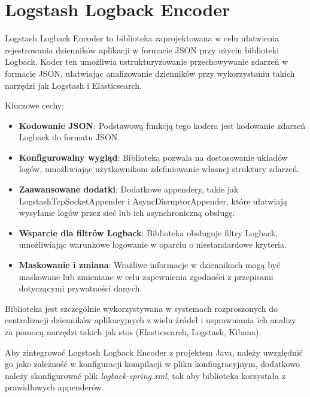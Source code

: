 \section{Logstash Logback Encoder}

Logstash Logback Encoder to biblioteka zaprojektowana w celu ułatwienia rejestrowania dzienników aplikacji w formacie JSON przy użyciu biblioteki Logback. Koder ten umożliwia ustrukturyzowanie przechowywanie zdarzeń w formacie JSON, ułatwiając analizowanie dzienników przy wykorzystaniu takich narzędzi jak Logstash i Elasticsearch\cite{logstashLogbackEncoderOverview}. 

Kluczowe cechy:

\begin{itemize}
    \item \textbf{Kodowanie JSON}: Podstawową funkcją tego kodera jest kodowanie zdarzeń Logback do formatu JSON\cite{logstashLogbackEncoderOverview}.
    \item \textbf{Konfigurowalny wygląd}: Biblioteka pozwala na dostosowanie układów logów, umożliwiając użytkownikom zdefiniowanie własnej struktury zdarzeń\cite{logstashLogbackEncoderOverview}.
    \item \textbf{Zaawansowane dodatki}: Dodatkowe appendery, takie jak LogstashTcpSocketAppender i AsyncDisruptorAppender, które ułatwiają wysyłanie logów przez sieć lub ich asynchroniczną obsługę\cite{logstashLogbackEncoderOverview}.
    \item \textbf{Wsparcie dla filtrów Logback}: Biblioteka obsługuje filtry Logback, umożliwiając warunkowe logowanie w oparciu o niestandardowe kryteria\cite{logstashLogbackEncoderOverview}.
    \item \textbf{Maskowanie i zmiana}: Wrażliwe informacje w dziennikach mogą być maskowane lub zmieniane w celu zapewnienia zgodności z przepisami dotyczącymi prywatności danych\cite{logstashLogbackEncoderOverview}.
\end{itemize}

Biblioteka jest szczególnie wykorzystywana w systemach rozproszonych do centralizacji dzienników aplikacyjnych z wielu źródeł i usprawniania ich analizy za pomocą narzędzi takich jak stos  (Elasticsearch, Logstash, Kibana)\cite{logstashLogbackEncoderOverview}.

Aby zintegrować Logstash Logback Encoder z projektem Java, należy uwzględnić go jako zależność w konfiguracji kompilacji w pliku konfiugracyjnym, dodatkowo należy skonfigurować plik \textit{logback-spring.xml}, tak aby biblioteka korzystała z prawidłowych appenderów\cite{logstashLogbackEncoderOverview}.